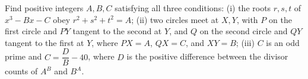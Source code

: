 Find positive integers $A,B,C$ satisfying all three conditions: (i) the roots $r,s,t$ of $x^3-Bx-C$ obey $r^2+s^2+t^2=A$; (ii) two circles meet at $X,Y$, with $P$ on the first circle and $PY$ tangent to the second at $Y$, and $Q$ on the second circle and $QY$ tangent to the first at $Y$, where $PX=A$, $QX=C$, and $XY=B$; (iii) $C$ is an odd prime and $C=\dfrac{D}{B}-40$, where $D$ is the positive difference between the divisor counts of $A^B$ and $B^A$.
